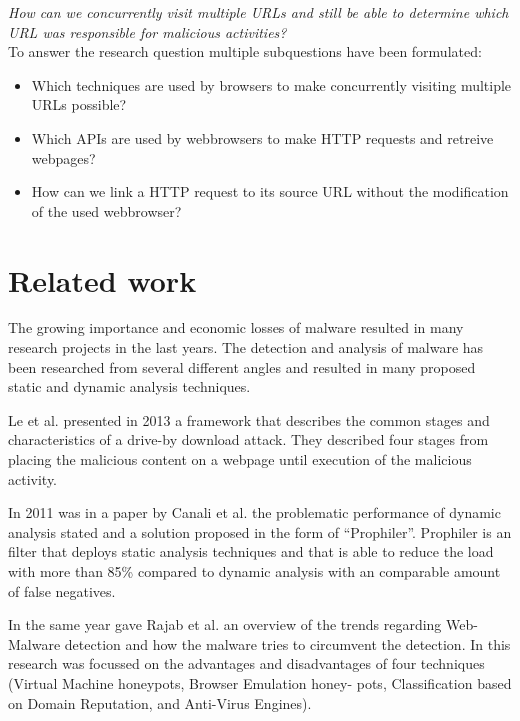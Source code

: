 \documentclass{scrartcl}
\begin{document}
\textit{How can we concurrently visit multiple URLs and still be able to determine which URL was responsible for malicious activities?}\\

To answer the research question multiple subquestions have been formulated:
 
\begin{itemize}

\item Which techniques are used by browsers to make concurrently visiting multiple URLs possible?
\item Which APIs are used by webbrowsers to make HTTP requests and retreive webpages?
\item How can we link a HTTP request to its source URL without the modification of the used webbrowser?

\end{itemize}

\section{Related work}

The growing importance and economic losses of malware resulted in many research projects in the last years. The detection and analysis of malware has been researched from several different angles and resulted in many proposed static and dynamic analysis techniques.

Le et al. \cite{Le2013} presented in 2013 a framework that describes the common stages and characteristics of a drive-by download attack. They described four stages from placing the malicious content on a webpage until execution of the malicious activity.

In 2011 was in a paper \cite{Canali2011} by Canali et al. the problematic performance of dynamic analysis stated and a solution proposed in the form of ``Prophiler''. Prophiler is an filter that deploys static analysis techniques and that is able to reduce the load with more than 85\% compared to dynamic analysis with an comparable amount of false negatives.

In the same year gave Rajab et al. \cite{Rajab11trendsin} an overview of the trends regarding Web-Malware detection and how the malware tries to circumvent the detection. In this research was focussed on the advantages and disadvantages of four techniques (Virtual Machine honeypots, Browser Emulation honey- pots, Classification based on Domain Reputation, and Anti-Virus Engines). 
\end{document}
